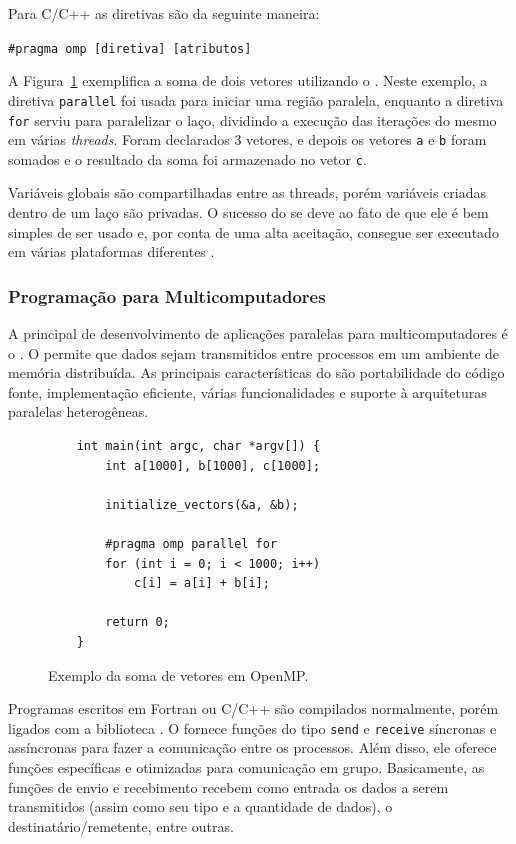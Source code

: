 Para C/C++ as diretivas são da seguinte maneira:
\begin{center}
\texttt{\#pragma omp [diretiva] [atributos]}
\end{center}

A Figura~\ref{fig:lstopenmp} exemplifica a soma de dois vetores utilizando o \openMP. Neste exemplo, a diretiva \texttt{parallel} foi usada para iniciar uma região paralela, enquanto a diretiva \texttt{for} serviu para paralelizar o laço, dividindo a execução das iterações do mesmo em várias \textit{threads}. Foram declarados 3 vetores, e depois os vetores \texttt{a} e \texttt{b} foram somados e o resultado da soma foi armazenado no vetor \texttt{c}.

Variáveis globais são compartilhadas entre as threads, porém variáveis criadas dentro de um laço são privadas. O sucesso do \openMP se deve ao fato de que ele é bem simples de ser usado e, por conta de uma alta aceitação, consegue ser executado em várias plataformas diferentes \cite{Chapman2008}.

\subsubsection{Programação para Multicomputadores}

A principal \api de desenvolvimento de aplicações paralelas para multicomputadores é o \mpi. O \mpi permite que dados sejam transmitidos entre processos em um ambiente de memória distribuída. As principais características do \mpi são portabilidade do código fonte, implementação eficiente, várias funcionalidades e suporte à arquiteturas paralelas heterogêneas.

\begin{figure}[t]
    \centering
    \begin{lstlisting}
    int main(int argc, char *argv[]) {
        int a[1000], b[1000], c[1000];
    
        initialize_vectors(&a, &b);
    
        #pragma omp parallel for
        for (int i = 0; i < 1000; i++)
            c[i] = a[i] + b[i];
                
        return 0;
    }
    \end{lstlisting}
    \caption{Exemplo da soma de vetores em OpenMP.}
    \label{fig:lstopenmp}
\end{figure}

Programas escritos em Fortran ou C/C++ são compilados normalmente, porém ligados com a biblioteca \mpi. O \mpi fornece funções do tipo \texttt{send} e \texttt{receive} síncronas e assíncronas para fazer a comunicação entre os processos. Além disso, ele oferece funções específicas e otimizadas para comunicação em grupo. Basicamente, as funções de envio e recebimento recebem como entrada os dados a serem transmitidos (assim como seu tipo e a quantidade de dados), o destinatário/remetente, entre outras.

